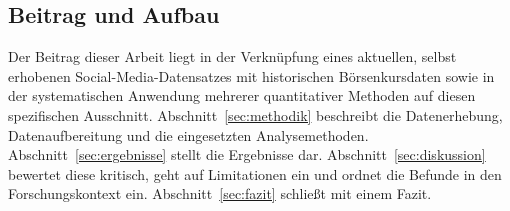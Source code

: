 \subsection*{Beitrag und Aufbau}

Der Beitrag dieser Arbeit liegt in der Verknüpfung eines aktuellen, selbst erhobenen Social-Media-Datensatzes mit historischen Börsenkursdaten sowie in der systematischen Anwendung mehrerer quantitativer Methoden auf diesen spezifischen Ausschnitt. Abschnitt~\ref{sec:methodik} beschreibt die Datenerhebung, Datenaufbereitung und die eingesetzten Analysemethoden. Abschnitt~\ref{sec:ergebnisse} stellt die Ergebnisse dar. Abschnitt~\ref{sec:diskussion} bewertet diese kritisch, geht auf Limitationen ein und ordnet die Befunde in den Forschungskontext ein. Abschnitt~\ref{sec:fazit} schließt mit einem Fazit.
